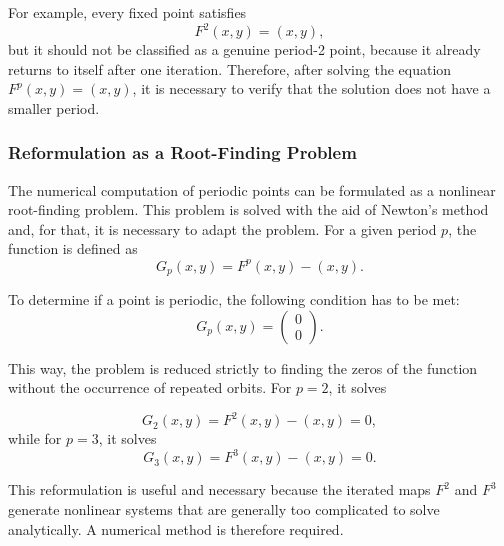 For example, every fixed point satisfies
\[
F^2(x,y)=(x,y),
\]
but it should not be classified as a genuine period-2 point, because it already returns to itself after one iteration. Therefore, after solving the equation \(F^p(x,y)=(x,y)\), it is necessary to verify that the solution does not have a smaller period.

\subsubsection{Reformulation as a Root-Finding Problem}

The numerical computation of periodic points can be formulated as a nonlinear root-finding problem. This problem is solved with the aid of Newton's method and, for that, it is necessary to adapt the problem. For a given period \(p\), the function is defined as
\[
G_p(x,y)=F^p(x,y)-(x,y).
\]

To determine if a point is periodic, the following condition has to be met:
\[
G_p(x,y)=
\begin{pmatrix}
0 \\
0
\end{pmatrix}.
\]

This way, the problem is reduced strictly to finding the zeros of the function without the occurrence of repeated orbits. For \(p=2\), it solves

\[
G_2(x,y)=F^2(x,y)-(x,y)=0,
\]
while for \(p=3\), it solves
\[
G_3(x,y)=F^3(x,y)-(x,y)=0.
\]

This reformulation is useful and necessary because the iterated maps \(F^2\) and \(F^3\) generate nonlinear systems that are generally too complicated to solve analytically. A numerical method is therefore required.


